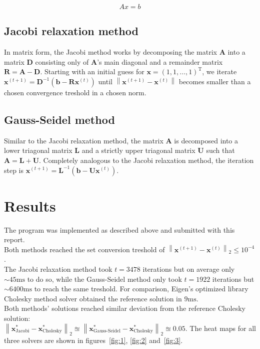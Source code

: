 \documentclass[11pt,a4paper]{article}
\renewcommand{\vec}[1]{\mathbf{#1}}
\newcommand{\norm}[1]{\left\lVert#1\right\rVert}
\begin{document}
\begin{equation}
Ax = b
\label{eqn:3}
\end{equation}


\subsection{Jacobi relaxation method}
In matrix form, the Jacobi method works by decomposing the matrix $\vec{A}$ into a matrix $\vec{D}$ consisting only of $\vec{A}$'s main diagonal
and a remainder matrix $\vec{R} = \vec{A} - \vec{D}$. Starting with an initial guess for $\vec{x} = (1, 1, \ldots, 1)^{\text{T}}$, we iterate $\vec{x}^{(t+1)} = \vec{D}^{-1}(\vec{b}- \vec{R}\vec{x}^{(t)})$
until $\norm{\vec{x}^{(t+1)} - \vec{x}^{(t)}}$ becomes smaller than a chosen convergence treshold in a chosen norm.


\subsection{Gauss-Seidel method}
Similar to the Jacobi relaxation method, the matrix $\vec{A}$ is decomposed into a lower triagonal matrix $\vec{L}$ and a strictly upper triagonal matrix $\vec{U}$ such that
$\vec{A} = \vec{L} + \vec{U}$. Completely analogous to the Jacobi relaxation method, the iteration step is  $\vec{x}^{(t+1)} = \vec{L}^{-1}(\vec{b}- \vec{U}\vec{x}^{(t)})$.

\section{Results}

The program was implemented as described above and submitted with this report. \\
Both methods reached the set conversion treshold of $\norm{\vec{x}^{(t+1)} - \vec{x}^{(t)}}_{2} \le 10^{-4}$. \\
The Jacobi relaxation method took $t=3478$ iterations but on average only $\sim 45 \text{ms}$ to do so, while the Gauss-Seidel method
only took $t=1922$ iterations but $\sim 6400 \text{ms}$ to reach the same treshold. For comparison, Eigen's optimized library Cholesky method
solver obtained the reference solution in $9 \text{ms}$.\\
Both methods' solutions reached similar deviation from the reference Cholesky solution:\\ 
$\norm{\vec{x}^*_{\text{Jacobi}} - \vec{x}^*_{\text{Cholesky}}}_{2} \approxeq  \norm{\vec{x}^*_{\text{Gauss-Seidel}} - \vec{x}^*_{\text{Cholesky}}}_{2} \approxeq 0.05$.
The heat maps for all three solvers are shown in figures~\ref{fig:1}, \ref{fig:2} and~\ref{fig:3}.
\end{document}
